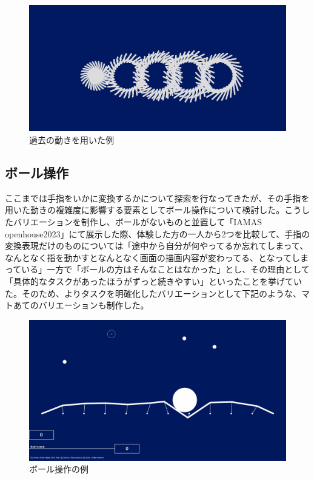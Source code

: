 \begin{figure}[H]
  \centering
  \includegraphics[width=15cm]{img/past_time.png}
  \caption{過去の動きを用いた例}
  \label{fig:prototype_delay}
\end{figure}

\subsection{ボール操作}
ここまでは手指をいかに変換するかについて探索を行なってきたが、その手指を用いた動きの複雑度に影響する要素としてボール操作について検討した。こうしたバリエーションを制作し、ボールがないものと並置して「IAMAS openhouse2023」にて展示した際、体験した方の一人から2つを比較して、手指の変換表現だけのものについては「途中から自分が何やってるか忘れてしまって、なんとなく指を動かすとなんとなく画面の描画内容が変わってる、となってしまっている」一方で「ボールの方はそんなことはなかった」とし、その理由として「具体的なタスクがあったほうがずっと続きやすい」といったことを挙げていた。そのため、よりタスクを明確化したバリエーションとして下記のような、マトあてのバリエーションも制作した。

\begin{figure}[H]
  \centering
  \includegraphics[width=15cm]{img/ball_overview.png}
  \caption{ボール操作の例}
  \label{fig:ball_overview}
\end{figure}


